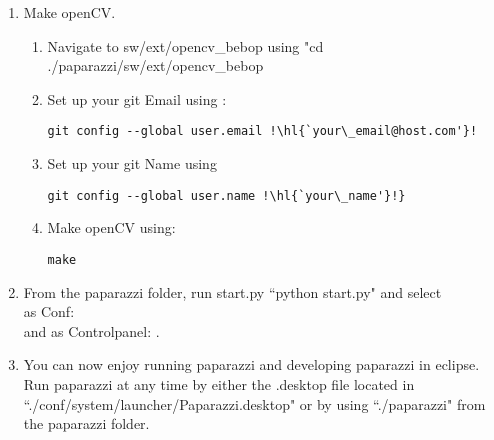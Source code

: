 \documentclass{article}
\begin{document}
\begin{enumerate}
{\begin{enumerate}
\end{enumerate}
}
\item{Make openCV.
\begin{enumerate}
\item{Navigate to sw/ext/opencv\_bebop using "cd ./paparazzi/sw/ext/opencv\_bebop}
\item{Set up your git Email using :
\begin{lstlisting}[style=Bash]
git config --global user.email !\hl{`your\_email@host.com'}!
\end{lstlisting}}
\item{Set up your git Name using
\begin{lstlisting}[style=Bash]
git config --global user.name !\hl{`your\_name'}!}
\end{lstlisting}}
\item{Make openCV using:
\begin{lstlisting}[style=Bash]
make
\end{lstlisting}}
\end{enumerate}
}
\item{From the paparazzi folder, run start.py ``python start.py" and select\\
as Conf: \\
and as Controlpanel: . }
\item{You can now enjoy running paparazzi and developing paparazzi in eclipse. Run paparazzi at any time by either the .desktop file located in ``./conf/system/launcher/Paparazzi.desktop" or by using ``./paparazzi" from the paparazzi folder.}
\end{enumerate}
\end{document}
